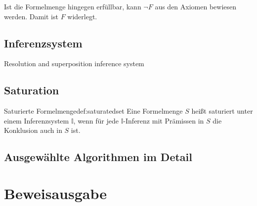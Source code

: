 \documentclass{article}
\begin{document}
Ist die Formelmenge hingegen erfüllbar, kann $\neg F$ aus den Axiomen bewiesen werden.
Damit ist $F$ widerlegt. \cite[S. 7]{cav2013}

\subsection{Inferenzsystem}
\label{subsec:inference}
Resolution and superposition inference system

\subsection{Saturation}
\label{subsec:saturation}


\begin{definition}{Saturierte Formelmenge}{def:saturatedset}
	Eine Formelmenge $S$ heißt saturiert unter einem Inferenzsystem $\mathds{I}$, wenn für jede $\mathds{I}$-Inferenz mit Prämissen in $S$ die Konklusion auch in $S$ ist.
\end{definition}



\subsection{Ausgewählte Algorithmen im Detail}
\label{subsec:algos}


\section{Beweisausgabe}
\label{sec:output}
\end{document}
